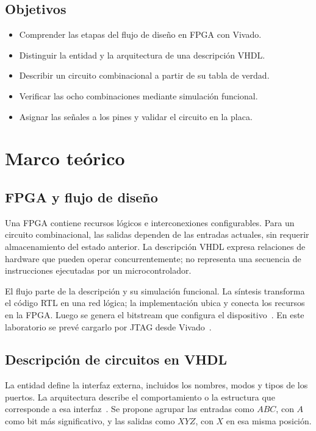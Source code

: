 \documentclass[conference]{IEEEtran}
\begin{document}
\subsection{Objetivos}
\begin{itemize}
\item Comprender las etapas del flujo de diseño en FPGA con Vivado.
\item Distinguir la entidad y la arquitectura de una descripción VHDL.
\item Describir un circuito combinacional a partir de su tabla de verdad.
\item Verificar las ocho combinaciones mediante simulación funcional.
\item Asignar las señales a los pines y validar el circuito en la placa.
\end{itemize}

\section{Marco teórico}
\subsection{FPGA y flujo de diseño}
Una FPGA contiene recursos lógicos e interconexiones configurables.
Para un circuito combinacional, las salidas dependen de las entradas
actuales, sin requerir almacenamiento del estado anterior. La
descripción VHDL expresa relaciones de hardware que pueden operar
concurrentemente; no representa una secuencia de instrucciones
ejecutadas por un microcontrolador.

El flujo parte de la descripción y su simulación funcional. La síntesis
transforma el código RTL en una red lógica; la implementación ubica
y conecta los recursos en la FPGA. Luego se genera el bitstream que
configura el dispositivo~\cite{vivado_impl}. En este laboratorio se
prevé cargarlo por JTAG desde Vivado~\cite{guia}.

\subsection{Descripción de circuitos en VHDL}
La entidad define la interfaz externa, incluidos los nombres, modos
y tipos de los puertos. La arquitectura describe el comportamiento o
la estructura que corresponde a esa interfaz~\cite{vhdl_entidad}.
Se propone agrupar las entradas como $ABC$, con $A$ como bit más
significativo, y las salidas como $XYZ$, con $X$ en esa misma posición.
\end{document}

